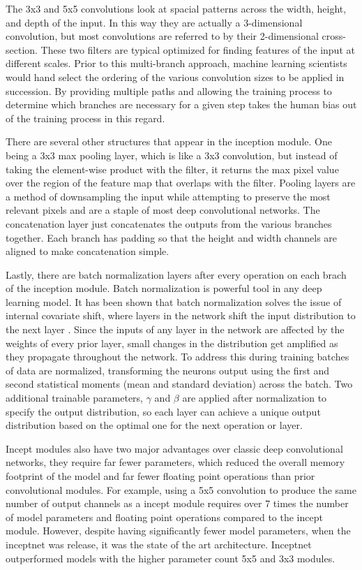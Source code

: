 The 3x3 and 5x5 convolutions look at spacial patterns across the width, height, and depth of the input. In this way they are actually a 3-dimensional convolution, but most convolutions are referred to by their 2-dimensional cross-section. These two filters are typical optimized for finding features of the input at different scales. Prior to this multi-branch approach, machine learning scientists would hand select the ordering of the various convolution sizes to be applied in succession. By providing multiple paths and allowing the training process to determine which branches are necessary for a given step takes the human bias out of the training process in this regard.

There are several other structures that appear in the inception module. One being a 3x3 max pooling layer, which is like a 3x3 convolution, but instead of taking the element-wise product with the filter, it returns the max pixel value over the region of the feature map that overlaps with the filter. Pooling layers are a method of downsampling the input while attempting to preserve the most relevant pixels and are a staple of most deep convolutional networks. The concatenation layer just concatenates the outputs from the various branches together. Each branch has padding so that the height and width channels are aligned to make concatenation simple.

Lastly, there are batch normalization layers after every operation on each brach of the inception module. Batch normalization is powerful tool in any deep learning model. It has been shown that batch normalization solves the issue of internal covariate shift, where layers in the network shift the input distribution to the next layer \cite{https://doi.org/10.48550/arxiv.1502.03167}. Since the inputs of any layer in the network are affected by the weights of every prior layer, small changes in the distribution get amplified as they propagate throughout the network. To address this during training batches of data are normalized, transforming the neurons output using the first and second statistical moments (mean and standard deviation) across the batch. Two additional trainable parameters, $\gamma$ and $\beta$ are applied after normalization to specify the output distribution, so each layer can achieve a unique output distribution based on the optimal one for the next operation or layer.

Incept modules also have two major advantages over classic deep convolutional networks, they require far fewer parameters, which reduced the overall memory footprint of the model and far fewer floating point operations than prior convolutional modules. For example, using a 5x5 convolution to produce the same number of output channels as a incept module requires over 7 times the number of model parameters and floating point operations compared to the incept module. However, despite having significantly fewer model parameters, when the inceptnet was release, it was the state of the art architecture. Inceptnet outperformed models with the higher parameter count 5x5 and 3x3 modules.

